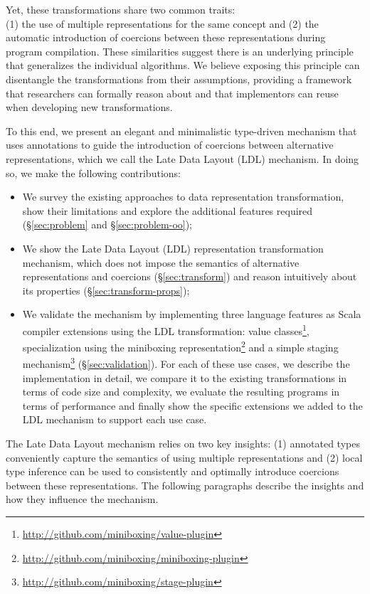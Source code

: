 Yet, these transformations share two common traits:\\ (1) the use of multiple representations for the same concept and (2) the automatic introduction of coercions between these representations during program compilation. These similarities suggest there is an underlying principle that generalizes the individual algorithms. We believe exposing this principle can disentangle the transformations from their assumptions, providing a framework that researchers can formally reason about and that implementors can reuse when developing new transformations.

To this end, we present an elegant and minimalistic type-driven mechanism that uses annotations to guide the introduction of coercions between alternative representations, which we call the Late Data Layout (LDL) mechanism. In doing so, we make the following contributions:

\begin{itemize}
\item We survey the existing approaches to data representation transformation, show their limitations and explore the additional features required (\S\ref{sec:problem} and \S\ref{sec:problem-oo});
\item We show the Late Data Layout (LDL) representation transformation mechanism, which does not impose the semantics of alternative representations and coercions (\S\ref{sec:transform}) and reason intuitively about its properties (\S\ref{sec:transform-props});
\item We validate the mechanism by implementing three language features as Scala compiler extensions using the LDL transformation: value classes\footnote{\url{http://github.com/miniboxing/value-plugin}}, specialization using the miniboxing representation\footnote{\url{http://github.com/miniboxing/miniboxing-plugin}} and a simple staging mechanism\footnote{\url{http://github.com/miniboxing/stage-plugin}} (\S\ref{sec:validation}). For each of these use cases, we describe the implementation in detail, we compare it to the existing transformations in terms of code size and complexity, we evaluate the resulting programs in terms of performance and finally show the specific extensions we added to the LDL mechanism to support each use case.
\end{itemize}

\noindent The Late Data Layout mechanism relies on two key insights: (1) annotated types conveniently capture the semantics of using multiple representations and (2) local type inference can be used to consistently and optimally introduce coercions between these representations. The following paragraphs describe the insights and how they influence the mechanism.

